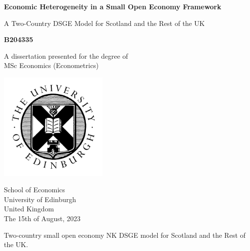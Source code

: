 \documentclass[12pt]{article}
\begin{document}
\begin{titlepage}
    \begin{center}
        \vspace*{1cm}
        \LARGE
        \textbf{Economic Heterogeneity in a Small Open Economy Framework}
 
        \vspace{0.5cm}
        A Two-Country DSGE Model for Scotland and the Rest of the UK
             
        \vspace{1.5cm}
 
        \textbf{B204335}
 
        \vfill
             
        A dissertation presented for the degree of\\
        MSc Economics (Econometrics) 
             
        \vspace{0.8cm}
      
        \includegraphics[width=0.4\textwidth]{uoe_logo.png}
             
        School of Economics\\
        University of Edinburgh\\
        United Kingdom\\
        The 15th of August, 2023
             
    \end{center}
 \end{titlepage}
Two-country small open economy NK DSGE model for Scotland and the Rest of the UK.
\end{document}
